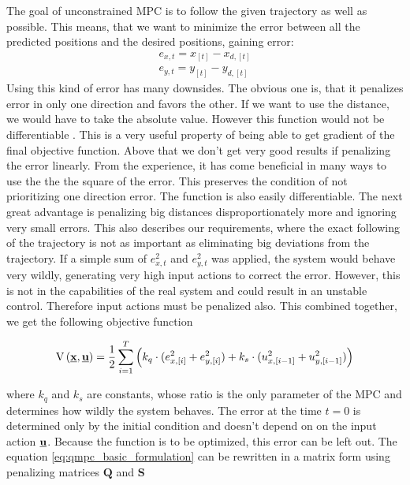 \documentclass{article}
\begin{document}
The goal of unconstrained MPC is to follow the given trajectory as well as possible. This means, that we want to minimize the error between all the predicted positions and the desired positions, gaining error:
\begin{equation}
\begin{split}
\label{eq:simple_err}
e_{x, t} = x_{[t]} - x_{d, [t]}\\
e_{y, t} = y_{[t]} - y_{d, [t]}
\end{split}
\end{equation}
Using this kind of error has many downsides. The obvious one is, that it penalizes error in only one direction and favors the other. If we want to use the distance, we would have to take the absolute value. However this function would not be differentiable \cite{stein1970singular}. This is a very useful property of being able to get gradient of the final objective function. Above that we don't get very good results if penalizing the error linearly. From the experience, it has come beneficial in many ways to use the the the square of the error. This preserves the condition of not prioritizing one direction error. The function is also easily differentiable. The next great advantage is penalizing big distances disproportionately more and ignoring very small errors. This also describes our requirements, where the exact following of the trajectory is not as important as eliminating big deviations from the trajectory. If a simple sum of $e_{x, t}^2$ and $e_{y, t}^2$ was applied, the system would behave very wildly, generating very high input actions to correct the error. However, this is not in the capabilities of the real system and could result in an unstable control. Therefore input actions must be penalized also. This combined together, we get the following objective function 

\begin{equation}
\label{eq:qmpc_basic_formulation}
\mathrm{V}\left(\textbf{\underline{x}}, \textbf{\underline{u}}\right) 
= \frac{1}{2}\sum_{i=1}^{T}\left( k_q \cdot (e^2_{x, [i]}+e^2_{y, [i]}) + k_s \cdot (u^2_{x, [i-1]}+u^2_{y, [i-1]})\right)
\end{equation}

where $k_q$ and $k_s$ are constants, whose ratio is the only parameter of the MPC and determines how wildly the system behaves. The error at the time $t = 0$ is determined only by the initial condition and doesn't depend on on the input action $\textbf{\underline{u}}$. Because the function is to be optimized, this error can be left out. The equation \ref{eq:qmpc_basic_formulation} can be rewritten in a matrix form using penalizing matrices $\textbf{Q}$ and $\textbf{S}$
\end{document}

